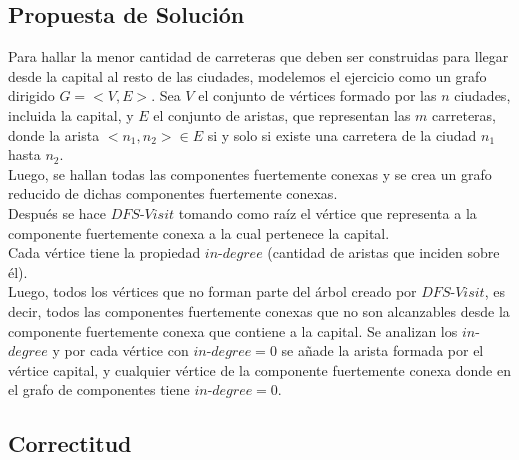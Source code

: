 \documentclass[a4paper,10pt]{article}
\begin{document}
	\subsection{Propuesta de Soluci\'on}
	Para hallar la menor cantidad de carreteras que deben ser construidas para llegar desde la capital al resto de las ciudades, modelemos el ejercicio como un grafo dirigido $G = <V,E>$. Sea $V$ el conjunto de v\'ertices formado por las $n$ ciudades, incluida la capital, y $E$ el conjunto de aristas, que representan las $m$ carreteras, donde la arista $<n_1,n_2> \in E$ si y solo si existe una carretera de la ciudad $n_1$ hasta $n_2$.
	\\Luego, se hallan todas las componentes fuertemente conexas y se crea un grafo reducido de dichas componentes fuertemente conexas.
	\\Despu\'es se hace $DFS$-$Visit$ tomando como ra\'iz el v\'ertice que representa a la componente fuertemente conexa a la cual pertenece la capital.
	\\Cada v\'ertice tiene la  propiedad $in$-$degree$ (cantidad de aristas que inciden sobre \'el).
	\\Luego, todos los v\'ertices que no forman parte del \'arbol creado por $DFS$-$Visit$, es decir, todos las componentes fuertemente conexas que no son alcanzables desde la componente fuertemente conexa que contiene a la capital. Se analizan los $in$-$degree$ y por cada v\'ertice con $in$-$degree = 0$ se a\~nade la arista formada por el v\'ertice capital, y cualquier v\'ertice de la componente fuertemente conexa donde en el grafo de componentes tiene $in$-$degree=0$.
	\subsection{Correctitud}
	
\end{document}
